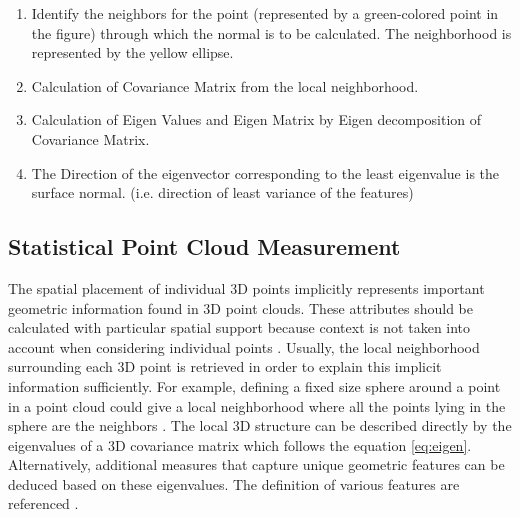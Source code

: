 \begin{enumerate}
    \item Identify the neighbors for the point (represented by a green-colored point in the figure) through which the normal is to be calculated. The neighborhood is represented by the yellow ellipse. 
    \item Calculation of Covariance Matrix from the local neighborhood.
    \item Calculation of Eigen Values and Eigen Matrix by Eigen decomposition of Covariance Matrix.
    \item The Direction of the eigenvector corresponding to the least eigenvalue is the surface normal. (i.e. direction of least variance of the features)
\end{enumerate}

\subsection{Statistical Point Cloud Measurement}
The spatial placement of individual 3D points implicitly represents important geometric information found in 3D point clouds. These attributes should be calculated with particular spatial support because context is not taken into account when considering individual points \parencite{weinmann2013feature}. Usually, the local neighborhood surrounding each 3D point is retrieved in order to explain this implicit information sufficiently. For example, defining a fixed size sphere around a point in a point cloud could give a local neighborhood where all the points lying in the sphere are the neighbors \parencite{lee2002perceptual}. The local 3D structure can be described directly by the eigenvalues of a 3D covariance matrix which follows the equation \ref{eq:eigen}. Alternatively, additional measures that capture unique geometric features can be deduced based on these eigenvalues. The definition of various features are referenced \parencite{weinmann2013feature}.

